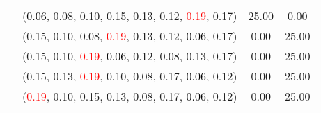 \documentclass[10pt,a4paper]{report}
\begin{document}
\begin{center}
\begin{longtable}{clcc}
			&(\textcolor{black}{0.06}, 0.08, 0.10, 0.15, 0.13, 0.12, \textcolor{red}{0.19}, 0.17)&25.00&0.00\\
			&(0.15, 0.10, 0.08, \textcolor{red}{0.19}, 0.13, 0.12, \textcolor{black}{0.06}, 0.17)&0.00&25.00\\
			&(0.15, 0.10, \textcolor{red}{0.19}, \textcolor{black}{0.06}, 0.12, 0.08, 0.13, 0.17)&0.00&25.00\\
			&(0.15, 0.13, \textcolor{red}{0.19}, 0.10, 0.08, 0.17, \textcolor{black}{0.06}, 0.12)&0.00&25.00\\
			&(\textcolor{red}{0.19}, 0.10, 0.15, 0.13, 0.08, 0.17, \textcolor{black}{0.06}, 0.12)&0.00&25.00\\
		\bottomrule
	\end{longtable}
\end{center}
\newpage
\end{document}
